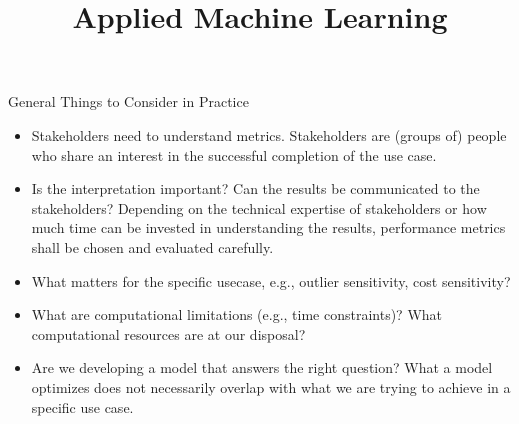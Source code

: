 \documentclass[11pt,compress,t,notes=noshow, aspectratio=169, xcolor=table]{beamer}
\title{Applied Machine Learning}
\date{}
\begin{document}
\newcommand{\titlefigure}{figure/performance_vs_interpretability}
\newcommand{\learninggoals}{
\item What to watch out for in practice
\item Pros and cons of performance metrics
\item Advanced evaluation practices}



\begin{frame}{General Things to Consider in Practice}

\begin{itemize}
\setlength\itemsep{2em}
    \item Stakeholders need to understand metrics. Stakeholders are (groups of) people who share an interest in the successful completion of the use case. 
    \item Is the interpretation important? Can the results be communicated to the stakeholders? Depending on the technical expertise of stakeholders or how much time can be invested in understanding the results, performance metrics shall be chosen and evaluated carefully.
    \item What matters for the specific usecase, e.g., outlier sensitivity, cost sensitivity?
    \item What are computational limitations (e.g., time constraints)? What computational resources are at our disposal?
    \item Are we developing a model that answers the right question? What a model optimizes does not necessarily overlap with what we are trying to achieve in a specific use case.
\end{itemize}
\end{frame}
\end{document}
